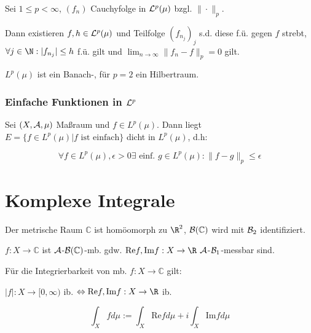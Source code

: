Sei $1 \leq p < \infty$, $(f_n)$ Cauchyfolge in $\mathcal{L}^p(\mu)$ bzgl. $\|\cdot\|_p$.

Dann existieren $f, h \in \mathcal{L}^p(\mu)$ und Teilfolge $(f_{n_j})_j$ s.d. diese f.ü. gegen $f$ strebt, $\forall j \in \N : |f_{n_j}| \leq h$ f.ü. gilt und $\displaystyle\lim_{n \to \infty} \|f_n - f\|_p = 0$ gilt.

$L^p(\mu)$ ist ein Banach-, für $p=2$ ein Hilbertraum.

\subsubsection*{Einfache Funktionen in $\mathcal{L}^p$}

Sei $(X,\mathcal{A},\mu)$ Maßraum und $f \in L^p(\mu)$. Dann liegt $E = \{ f \in L^p(\mu) | f \text{ ist einfach} \}$ dicht in $L^p(\mu)$, d.h:

\vspace{-4mm}
\[ \forall f \in L^p(\mu), \epsilon > 0 \exists \text{ einf. } g \in L^p(\mu) : \| f - g \|_p \leq \epsilon \]

\section*{Komplexe Integrale}

Der metrische Raum $\mathbb{C}$ ist homöomorph zu $\R^2$, $\mathcal{B}(\mathbb{C})$ wird mit $\mathcal{B}_2$ identifiziert.

$f : X \to \mathbb{C}$ ist $\mathcal{A}$-$\mathcal{B}(\mathbb{C})$-mb. gdw. $\text{Re} f, \text{Im} f : X \to \R$ $\mathcal{A}$-$\mathcal{B}_1$-messbar sind.

Für die Integrierbarkeit von mb. $f : X \to \mathbb{C}$ gilt:

$|f| : X \to [0,\infty)$ ib. $\Leftrightarrow \text{Re} f, \text{Im} f : X \to \R$ ib.

\[ \int_X f d\mu := \int_X \text{Re} f d\mu + i \int_X \text{Im} f d\mu \]

